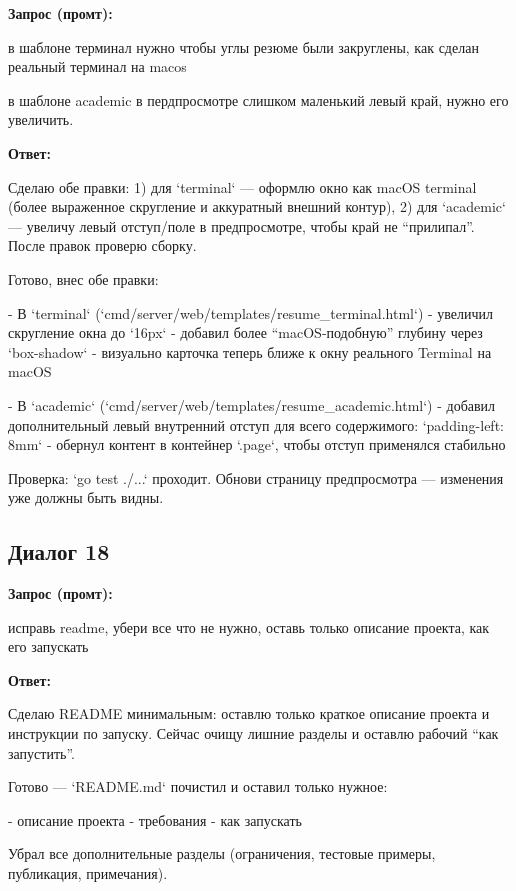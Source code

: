\documentclass[a4paper, 14pt]{extarticle} %
\begin{document}
\textbf{Запрос (промт):}

\begin{PromptBlock}

в шаблоне терминал нужно чтобы углы резюме были закруглены, как сделан реальный терминал на macos

в шаблоне academic в пердпросмотре слишком маленький левый край, нужно его увеличить.

\end{PromptBlock}

\textbf{Ответ:}

\begin{AnswerBlock}

Сделаю обе правки:  
1) для `terminal` — оформлю окно как macOS terminal (более выраженное скругление и аккуратный внешний контур),  
2) для `academic` — увеличу левый отступ/поле в предпросмотре, чтобы край не “прилипал”.  
После правок проверю сборку.

Готово, внес обе правки:

- В `terminal` (`cmd/server/web/templates/resume_terminal.html`)
  - увеличил скругление окна до `16px`
  - добавил более “macOS‑подобную” глубину через `box-shadow`
  - визуально карточка теперь ближе к окну реального Terminal на macOS

- В `academic` (`cmd/server/web/templates/resume_academic.html`)
  - добавил дополнительный левый внутренний отступ для всего содержимого: `padding-left: 8mm`
  - обернул контент в контейнер `.page`, чтобы отступ применялся стабильно

Проверка: `go test ./...` проходит.  
Обнови страницу предпросмотра — изменения уже должны быть видны.

\end{AnswerBlock}

\subsection*{Диалог 18}

\textbf{Запрос (промт):}

\begin{PromptBlock}

исправь readme, убери все что не нужно, оставь только описание проекта, как его запускать

\end{PromptBlock}

\textbf{Ответ:}

\begin{AnswerBlock}

Сделаю README минимальным: оставлю только краткое описание проекта и инструкции по запуску. Сейчас очищу лишние разделы и оставлю рабочий “как запустить”.

Готово — `README.md` почистил и оставил только нужное:

- описание проекта
- требования
- как запускать

Убрал все дополнительные разделы (ограничения, тестовые примеры, публикация, примечания).

\end{AnswerBlock}
\end{document}
